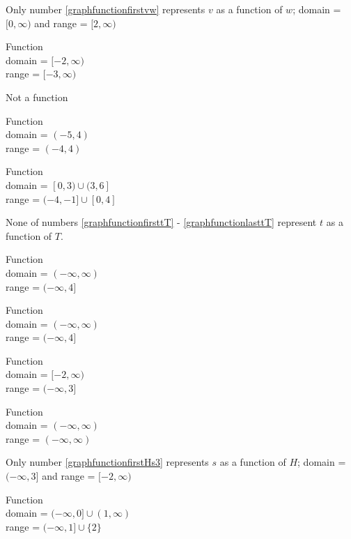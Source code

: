 \begin{exenum}
\item Only number \ref{graphfunctionfirstvw} represents $v$ as a function of $w$;  domain = $[0, \infty)$ and range = $[2, \infty)$

\item  Function \\  domain =  $[-2, \infty)$ \\ range = $[-3, \infty)$

\item Not a function

\item Function \\  domain =  $(-5, 4)$ \\ range = $(-4, 4)$

\item  Function \\ domain = $[0,3) \cup (3,6]$ \\ range = $(-4,-1] \cup [0,4]$

\item None of numbers \ref{graphfunctionfirsttT} - \ref{graphfunctionlasttT}  represent $t$ as a function of $T$.

\item  Function \\ domain = $(-\infty, \infty)$ \\ range = $(-\infty, 4]$

\item  Function \\ domain = $(-\infty, \infty)$ \\ range = $(-\infty, 4]$

\item  Function \\  domain =  $[-2, \infty)$  \\ range =   $(-\infty, 3]$

\item  Function \\ domain = $(-\infty, \infty)$ \\ range = $(-\infty, \infty)$

\item Only number \ref{graphfunctionfirstHs3} represents $s$ as a function of $H$;  domain =  $(-\infty, 3]$  and range =   $[-2, \infty)$


\item  Function \\  domain =  $(-\infty, 0] \cup (1, \infty)$ \\ range =  $(-\infty, 1] \cup \{ 2\}$


\end{exenum}
